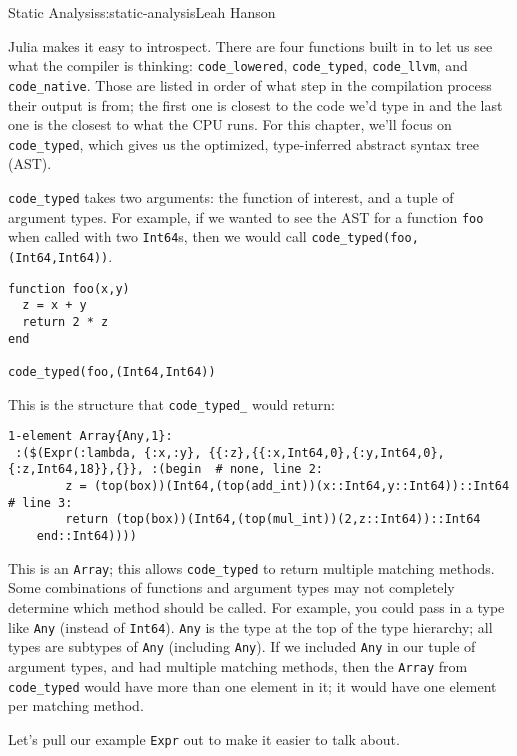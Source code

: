\begin{aosachapter}{Static Analysis}{s:static-analysis}{Leah Hanson}
\label{introspection-in-julia}

Julia makes it easy to introspect. There are four functions built in to
let us see what the compiler is thinking: \texttt{code\_lowered},
\texttt{code\_typed}, \texttt{code\_llvm}, and \texttt{code\_native}.
Those are listed in order of what step in the compilation process their
output is from; the first one is closest to the code we'd type in and
the last one is the closest to what the CPU runs. For this chapter,
we'll focus on \texttt{code\_typed}, which gives us the optimized,
type-inferred abstract syntax tree (AST).

\texttt{code\_typed} takes two arguments: the function of interest, and
a tuple of argument types. For example, if we wanted to see the AST for
a function \texttt{foo} when called with two \texttt{Int64}s, then we
would call \texttt{code\_typed(foo, (Int64,Int64))}.

\begin{verbatim}
function foo(x,y)
  z = x + y
  return 2 * z
end

code_typed(foo,(Int64,Int64))
\end{verbatim}

This is the structure that \texttt{code\_typed\_} would return:

\begin{verbatim}
1-element Array{Any,1}:
 :($(Expr(:lambda, {:x,:y}, {{:z},{{:x,Int64,0},{:y,Int64,0},{:z,Int64,18}},{}}, :(begin  # none, line 2:
        z = (top(box))(Int64,(top(add_int))(x::Int64,y::Int64))::Int64 # line 3:
        return (top(box))(Int64,(top(mul_int))(2,z::Int64))::Int64
    end::Int64))))
\end{verbatim}

This is an \texttt{Array}; this allows \texttt{code\_typed} to return
multiple matching methods. Some combinations of functions and argument
types may not completely determine which method should be called. For
example, you could pass in a type like \texttt{Any} (instead of
\texttt{Int64}). \texttt{Any} is the type at the top of the type
hierarchy; all types are subtypes of \texttt{Any} (including
\texttt{Any}). If we included \texttt{Any} in our tuple of argument
types, and had multiple matching methods, then the \texttt{Array} from
\texttt{code\_typed} would have more than one element in it; it would
have one element per matching method.

Let's pull our example \texttt{Expr} out to make it easier to talk
about.


\end{aosachapter}
